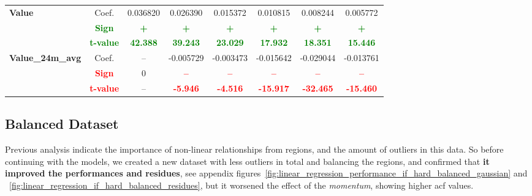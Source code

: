 \documentclass[11pt,english,a4paper,hidelinks]{book}
\begin{document}
\begin{table}[H]
\begin{tabular}{lccccccc}
        \midrule
        \multirow{3}{*}{\textbf{Value}}
            & Coef.   & 0.036820  & 0.026390  & 0.015372  & 0.010815  & 0.008244  & 0.005772  \\
            & \textbf{\textcolor{green}{Sign}}    & \textbf{\textcolor{green}{+}}         & \textbf{\textcolor{green}{+}}         & \textbf{\textcolor{green}{+}}         & \textbf{\textcolor{green}{+}}         & \textbf{\textcolor{green}{+}}         & \textbf{\textcolor{green}{+}}         \\
            & \textbf{\textcolor{green}{t-value}} & \textbf{\textcolor{green}{42.388}}    & \textbf{\textcolor{green}{39.243}}    & \textbf{\textcolor{green}{23.029}}    & \textbf{\textcolor{green}{17.932}}    & \textbf{\textcolor{green}{18.351}}    & \textbf{\textcolor{green}{15.446}}    \\
        \multirow{3}{*}{\textbf{Value\_24m\_avg}} 
            & Coef.   & -- & -0.005729 & -0.003473 & -0.015642 & -0.029044 & -0.013761 \\
            & \textbf{\textcolor{red}{Sign}}    & 0  & \textbf{\textcolor{red}{–}}         & \textbf{\textcolor{red}{–}}         & \textbf{\textcolor{red}{–}}         & \textbf{\textcolor{red}{–}}         & \textbf{\textcolor{red}{–}}         \\
            & \textbf{\textcolor{red}{t-value}} & -- & \textbf{\textcolor{red}{-5.946}}    & \textbf{\textcolor{red}{-4.516}}    & \textbf{\textcolor{red}{-15.917}}   & \textbf{\textcolor{red}{-32.465}}   & \textbf{\textcolor{red}{-15.460}}   \\
        \bottomrule
    \end{tabular}
    \label{tab:africa_middle_east_windowed_consistency_summary}
\end{table}

\subsection{Balanced Dataset}

Previous analysis indicate the importance of non-linear relationships from regions, and the amount of outliers in this data. So before continuing with the models, we created a new dataset with less outliers in total and balancing the regions, and confirmed that \textbf{it improved the performances and residues}, see appendix figures~\ref{fig:linear_regression_performance_if_hard_balanced_gaussian} and ~\ref{fig:linear_regression_if_hard_balanced_residues}, but it worsened the effect of the \textit{momentum}, showing higher \acrshort{acf} values.
\end{document}
